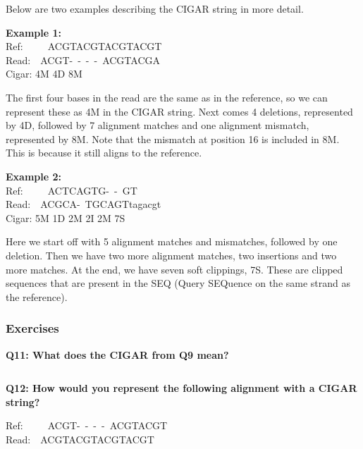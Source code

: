 \documentclass[11pt]{article}
\makeatletter
\newcommand{\boxspacing}{\kern\kvtcb@left@rule\kern\kvtcb@boxsep}
\newcommand{\prompt}[4]{
        {\ttfamily\llap{{\color{blue}\LARGE\faKeyboardO\hspace{3pt}#4}}\vspace{-\baselineskip}}
    }
\makeatother
\begin{document}
Below are two examples describing the CIGAR string in more detail.

\textbf{Example 1:}\\
Ref:~~~~~ACGTACGTACGTACGT\\
Read:~~ACGT-~-~-~-~ACGTACGA\\
Cigar: 4M 4D 8M

The first four bases in the read are the same as in the reference, so we
can represent these as 4M in the CIGAR string. Next comes 4 deletions,
represented by 4D, followed by 7 alignment matches and one alignment
mismatch, represented by 8M. Note that the mismatch at position 16 is
included in 8M. This is because it still aligns to the reference.

\textbf{Example 2:}\\
Ref:~~~~~ACTCAGTG-~-~GT\\
Read:~~ACGCA-~TGCAGTtagacgt\\
Cigar: 5M 1D 2M 2I 2M 7S

Here we start off with 5 alignment matches and mismatches, followed by
one deletion. Then we have two more alignment matches, two insertions
and two more matches. At the end, we have seven soft clippings, 7S.
These are clipped sequences that are present in the SEQ (Query SEQuence
on the same strand as the reference).

\hypertarget{exercises}{%
\subsubsection{Exercises}\label{exercises}}

\textbf{Q11: What does the CIGAR from Q9 mean?}

    \begin{tcolorbox}[breakable, size=fbox, boxrule=1pt, pad at break*=1mm,colback=cellbackground, colframe=cellborder]
\prompt{In}{incolor}{ }{\boxspacing}
\begin{Verbatim}[commandchars=\\\{\}]

\end{Verbatim}
\end{tcolorbox}

    \textbf{Q12: How would you represent the following alignment with a
CIGAR string?}

Ref:~~~~~ACGT-~-~-~-~ACGTACGT\\
Read:~~ACGTACGTACGTACGT

    \begin{tcolorbox}[breakable, size=fbox, boxrule=1pt, pad at break*=1mm,colback=cellbackground, colframe=cellborder]
\prompt{In}{incolor}{ }{\boxspacing}
\begin{Verbatim}[commandchars=\\\{\}]

\end{Verbatim}
\end{tcolorbox}
\end{document}
